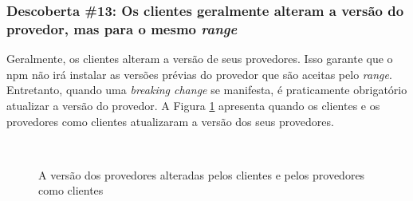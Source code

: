\subsubsection{Descoberta \#13: Os clientes geralmente alteram a versão do provedor, mas para o mesmo \textit{range}}

Geralmente, os clientes alteram a versão de seus provedores. Isso garante que o \textsf{npm} não irá instalar as versões prévias do provedor que são aceitas pelo \textit{range}. Entretanto, quando uma \textit{breaking change} se manifesta, é praticamente obrigatório atualizar a versão do provedor. A Figura \ref{fig:semver_both} apresenta quando os clientes e os provedores como clientes atualizaram a versão dos seus provedores.

\begin {figure} [h!]
   \centering
   \mbox {
        \quad
    }
    \caption{A versão dos provedores alteradas pelos clientes e pelos provedores como clientes}
    \label{fig:semver_both}
\end{figure}

